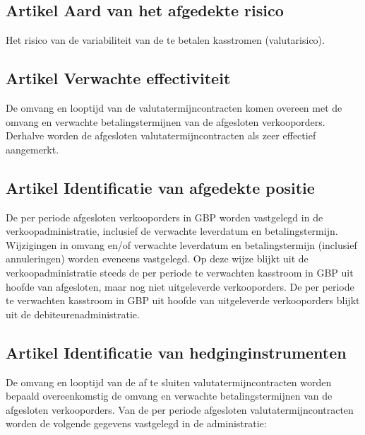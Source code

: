 \subsection*{Artikel \theartikel \hspace{1em} Aard van het afgedekte risico}
Het risico van de variabiliteit van de te betalen kasstromen (valutarisico).


\subsection*{Artikel \theartikel \hspace{1em} Verwachte effectiviteit}
De omvang en looptijd van de valutatermijncontracten komen overeen met de omvang en verwachte betalingstermijnen van de afgesloten verkooporders. Derhalve worden de afgesloten valutatermijncontracten als zeer effectief aangemerkt.

\subsection*{Artikel \theartikel \hspace{1em} Identificatie van afgedekte positie}
De per periode afgesloten verkooporders in GBP worden vastgelegd in de verkoopadministratie, inclusief de verwachte leverdatum en betalingstermijn. Wijzigingen in omvang en/of verwachte leverdatum en betalingstermijn (inclusief annuleringen) worden eveneens vastgelegd. Op deze wijze blijkt uit de verkoopadministratie steeds de per periode te verwachten kasstroom in GBP uit hoofde van afgesloten, maar nog niet uitgeleverde verkooporders. De per periode te verwachten kasstroom in GBP uit hoofde van uitgeleverde verkooporders blijkt uit de debiteurenadministratie.


\subsection*{Artikel \theartikel \hspace{1em} Identificatie van hedginginstrumenten}
De omvang en looptijd van de af te sluiten valutatermijncontracten worden bepaald overeenkomstig de omvang en verwachte betalingstermijnen van de
afgesloten verkooporders. Van de per periode afgesloten valutatermijncontracten worden de volgende gegevens vastgelegd in de administratie:

